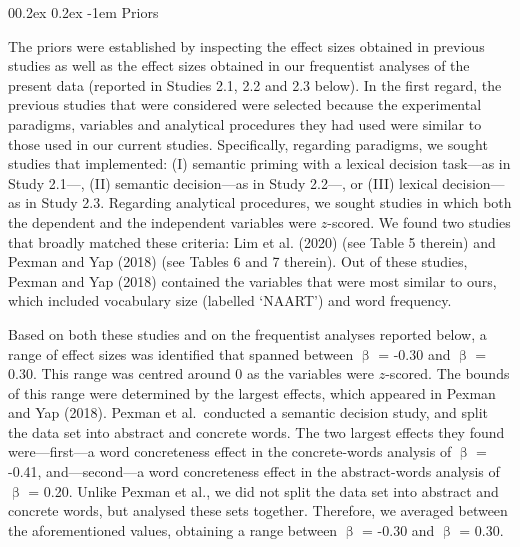 \documentclass[
  12pt,
  man,floatsintext]{apa7}
\makeatletter
\let\oldparagraph\paragraph
\renewcommand{\paragraph}[1]{\oldparagraph{#1}\mbox{}}
\renewcommand{\paragraph}{\@startsection{paragraph}{4}{\parindent}%
  {0\baselineskip \@plus 0.2ex \@minus 0.2ex}%
  {-1em}%
  {\normalfont\normalsize\bfseries\itshape\typesectitle}}
\makeatother
\begin{document}
\hypertarget{priors}{%
\paragraph{Priors}\label{priors}}

The priors were established by inspecting the effect sizes obtained in previous studies as well as the effect sizes obtained in our frequentist analyses of the present data (reported in Studies 2.1, 2.2 and 2.3 below). In the first regard, the previous studies that were considered were selected because the experimental paradigms, variables and analytical procedures they had used were similar to those used in our current studies. Specifically, regarding paradigms, we sought studies that implemented: (I) semantic priming with a lexical decision task---as in Study 2.1---, (II) semantic decision---as in Study 2.2---, or (III) lexical decision---as in Study 2.3. Regarding analytical procedures, we sought studies in which both the dependent and the independent variables were \(z\)-scored. We found two studies that broadly matched these criteria: Lim et al. (2020) (see Table 5 therein) and Pexman and Yap (2018) (see Tables 6 and 7 therein). Out of these studies, Pexman and Yap (2018) contained the variables that were most similar to ours, which included vocabulary size (labelled `NAART') and word frequency.

Based on both these studies and on the frequentist analyses reported below, a range of effect sizes was identified that spanned between \(\upbeta\) = -0.30 and \(\upbeta\) = 0.30. This range was centred around 0 as the variables were \(z\)-scored. The bounds of this range were determined by the largest effects, which appeared in Pexman and Yap (2018). Pexman et al.~conducted a semantic decision study, and split the data set into abstract and concrete words. The two largest effects they found were---first---a word concreteness effect in the concrete-words analysis of \(\upbeta\) = -0.41, and---second---a word concreteness effect in the abstract-words analysis of \(\upbeta\) = 0.20. Unlike Pexman et al., we did not split the data set into abstract and concrete words, but analysed these sets together. Therefore, we averaged between the aforementioned values, obtaining a range between \(\upbeta\) = -0.30 and \(\upbeta\) = 0.30.
\end{document}
